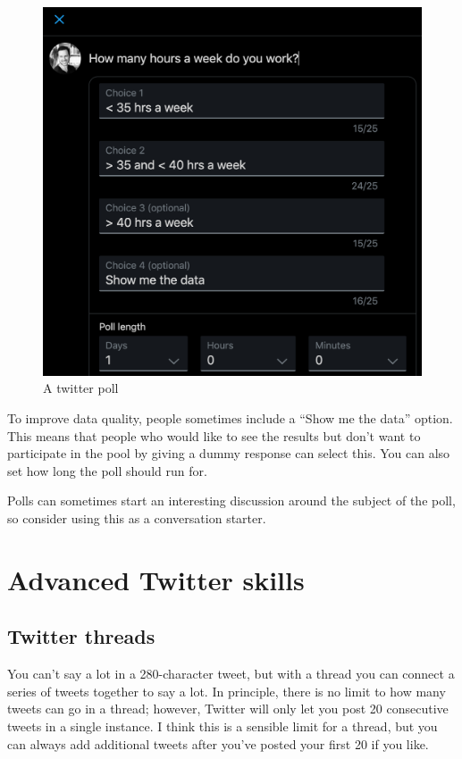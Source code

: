 \documentclass[]{book}
\begin{document}
\begin{figure}

{\centering \includegraphics[width=0.8\linewidth]{images/poll} 

}

\caption{A twitter poll}\label{fig:poll}
\end{figure}

To improve data quality, people sometimes include a ``Show me the data'' option. This means that people who would like to see the results but don't want to participate in the pool by giving a dummy response can select this. You can also set how long the poll should run for.

Polls can sometimes start an interesting discussion around the subject of the poll, so consider using this as a conversation starter.

\hypertarget{advanced-twitter-skills}{%
\chapter{Advanced Twitter skills}\label{advanced-twitter-skills}}

\hypertarget{twitter-threads}{%
\section{Twitter threads}\label{twitter-threads}}

You can't say a lot in a 280-character tweet, but with a thread you can connect a series of tweets together to say a lot. In principle, there is no limit to how many tweets can go in a thread; however, Twitter will only let you post 20 consecutive tweets in a single instance. I think this is a sensible limit for a thread, but you can always add additional tweets after you've posted your first 20 if you like.
\end{document}
